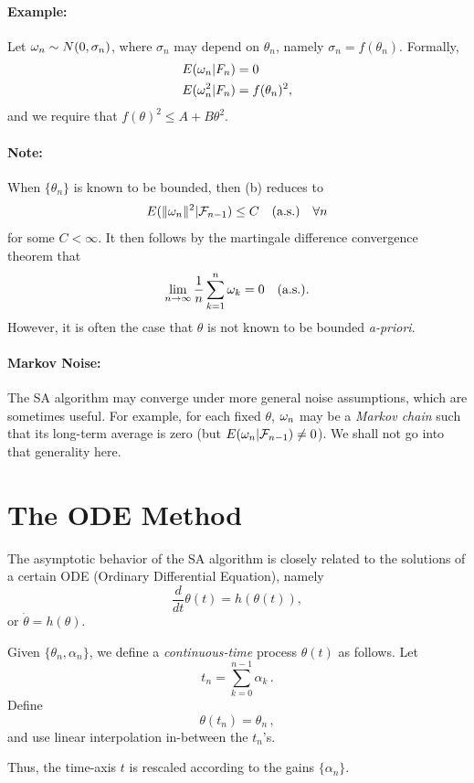 \paragraph{Example:} Let $\omega_n \sim N(0,\sigma_n)$, where $\sigma_n$
may depend on $\theta_n$, namely $\sigma_n = f(\theta_n)$.  Formally,
\begin{align*}
E(\omega_n| F_n) & = 0\\
E(\omega_n^2| F_n) & = f(\theta_n)^2,
\end{align*}
and we require that $f(\theta)^2 \le A+B\theta^2$.

\paragraph{Note:}
When $\{\theta_n\}$ is known to be bounded, then (b) reduces to
$$
E(\| \omega_n\|^2 | \mathcal F_{n-1}) \le C  \quad \text{(a.s.)} \quad
\forall n
$$
for some $C<\infty$.
It then follows by the martingale difference convergence theorem that
$$
\lim_{n \to \infty} \frac{1}{n} \sum_{k=1}^n \omega_k = 0 \quad \text{(a.s.)}.
$$
However, it is often the case that $\theta$ is not known to be bounded
{\em a-priori}.


\paragraph{Markov Noise:}
The SA algorithm may converge under more general noise
assumptions, which are sometimes useful. For example, for each fixed $\theta$,
$\omega_n$ may be a {\em Markov chain} such that its long-term average is zero
(but $E(\omega_n|\mathcal F_{n-1}) \not= 0$). We shall not go into that generality here.

\section{The ODE Method}

The asymptotic behavior of the SA algorithm is closely related to the solutions
of a certain ODE (Ordinary Differential Equation), namely
$$
\frac{d}{dt}\theta(t)=h(\theta(t)),
$$
or $\dot{\theta}=h(\theta)$.

Given $\{\theta_n, \alpha_n\}$, we define a {\em continuous-time} process
$\theta(t)$ as follows.  Let
$$
t_n = \sum_{k=0}^{n-1} \alpha_k\,.
$$
Define
$$
\theta(t_n) = \theta_n\,,
$$
and use linear interpolation in-between the $t_n$'s.

Thus, the time-axis $t$ is rescaled according to the gains $\{\alpha_n\}$.

